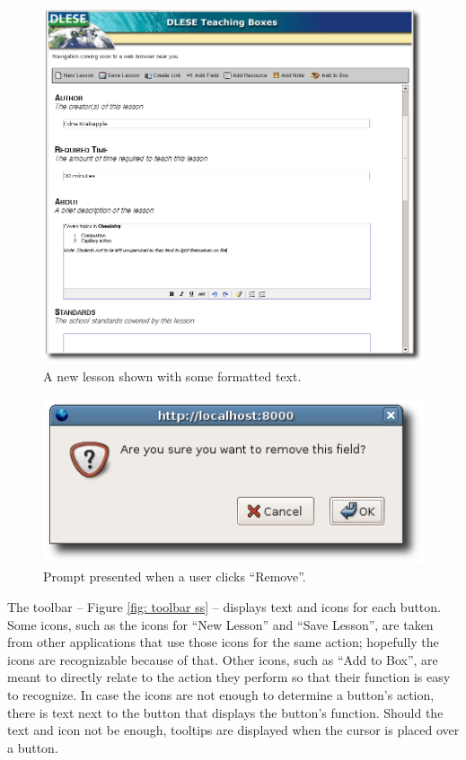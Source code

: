 \documentclass[10pt,letter]{article}
\begin{document}
\begin{figure}
	\centering
	\includegraphics[width=0.9\linewidth]{figures/formatting}
	\caption{A new lesson shown with some formatted text.}
	\label{fig: blank lesson ss}
\end{figure}

\begin{figure}
	\centering
	\includegraphics[width=0.45\linewidth]{figures/remove_prompt}
	\caption{Prompt presented when a user clicks ``Remove''.}
	\label{fig: remove prompt ss}
\end{figure}

The toolbar -- Figure \ref{fig: toolbar ss} -- displays text and icons for each
button. Some icons, such as the icons for ``New Lesson'' and ``Save Lesson'',
are taken from other applications that use those icons for the same action;
hopefully the icons are recognizable because of that. Other icons, such as ``Add
to Box'', are meant to directly relate to the action they perform so that their
function is easy to recognize. In case the icons are not enough to determine a
button's action, there is text next to the button that displays the button's
function. Should the text and icon not be enough, tooltips are displayed when
the cursor is placed over a button.
\end{document}
